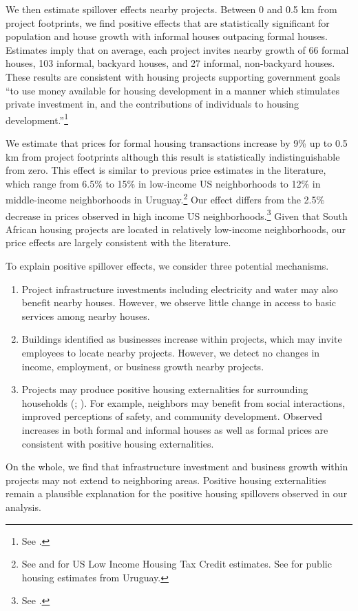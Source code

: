 \documentclass[12pt]{article}
\newcommand{\rv}{}
\begin{document}
\rv{We then estimate spillover effects nearby projects.}  Between 0 and 0.5 km from project footprints, we find positive effects that are statistically significant for population and house growth with informal houses outpacing formal houses.   \rv{Estimates imply that on average, each project invites nearby growth of 66 formal houses, 103 informal, backyard houses, and 27 informal, non-backyard houses.}  These results are consistent with housing projects supporting government goals ``to use money available for housing development in a manner which stimulates private investment in, and the contributions of individuals to housing development.''\footnote{See \cite{housingact}.} 

\rv{We estimate that prices for formal housing transactions increase by 9\% up to 0.5 km from project footprints although this result is statistically indistinguishable from zero.  This effect is similar to previous price estimates in the literature, which range from 6.5\% to 15\% in low-income US neighborhoods to 12\% in middle-income neighborhoods in Uruguay.\footnote{See \cite{diamond2019wants} and \cite{baum2009effects} for US Low Income Housing Tax Credit estimates.  See \cite{gonzalez2022spillover} for public housing estimates from Uruguay.}  Our effect differs from the 2.5\% decrease in prices observed in high income US neighborhoods.\footnote{See \citep{diamond2019wants}.}  Given that South African housing projects are located in relatively low-income neighborhoods, our price effects are largely consistent with the literature. }

\rv{To explain positive spillover effects, we consider three potential mechanisms.}
\begin{enumerate}
  \item \rv{Project infrastructure investments including electricity and water may also benefit nearby houses.  However, we observe little change in access to basic services among nearby houses.}
  \item \rv{Buildings identified as businesses increase within projects, which may invite employees to locate nearby projects.  However, we detect no changes in income, employment, or business growth nearby projects.}
  \item \rv{Projects may produce positive housing externalities for surrounding households (\cite{rossi2010housing}; \cite{diamond2019wants}).  For example, neighbors may benefit from social interactions, improved perceptions of safety, and community development.  Observed increases in both formal and informal houses as well as formal prices are consistent with positive housing externalities.}
\end{enumerate}
\rv{On the whole, we find that infrastructure investment and business growth within projects may not extend to neighboring areas.  Positive housing externalities remain a plausible explanation for the positive housing spillovers observed in our analysis.}
\end{document}
